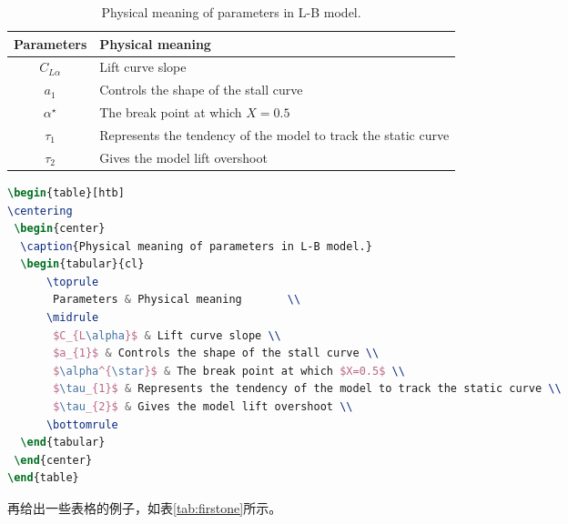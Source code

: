 \begin{table}[htb]               %
\centering
 \begin{center}
  \caption{Physical meaning of parameters in L-B model.}
  \label{tab:LB-parameters}
  \begin{tabular}{cl}
      \toprule
       Parameters & Physical meaning       \\
      \midrule   %
       $C_{L\alpha}$ & Lift curve slope \\
       $a_{1}$ & Controls the shape of the stall curve \\
       $\alpha^{\star}$ & The break point at which $X=0.5$ \\
       $\tau_{1}$ & Represents the tendency of the model to track the static curve \\
       $\tau_{2}$ & Gives the model lift overshoot \\
      \bottomrule
  \end{tabular}
 \end{center}
\end{table}

\begin{lstlisting}[language={TeX}, caption={插入表格}]
\begin{table}[htb]
\centering
 \begin{center}
  \caption{Physical meaning of parameters in L-B model.}
  \begin{tabular}{cl}
      \toprule
       Parameters & Physical meaning       \\
      \midrule 
       $C_{L\alpha}$ & Lift curve slope \\
       $a_{1}$ & Controls the shape of the stall curve \\
       $\alpha^{\star}$ & The break point at which $X=0.5$ \\
       $\tau_{1}$ & Represents the tendency of the model to track the static curve \\
       $\tau_{2}$ & Gives the model lift overshoot \\
      \bottomrule
  \end{tabular}
 \end{center}
\end{table}
\end{lstlisting}

再给出一些表格的例子，如表\ref{tab:firstone}所示。

